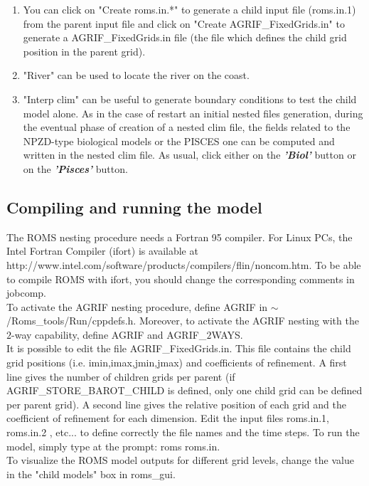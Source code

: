 \begin{enumerate}
\item You can click on "Create roms.in.*" to generate a child input file (roms.in.1)
  from the parent input file and click on "Create AGRIF\_FixedGrids.in" to generate a
  AGRIF\_FixedGrids.in file (the file which defines the child grid position in the
  parent grid).

\item "River" can be used to locate the river on the coast.

\item "Interp clim" can be useful to generate boundary conditions to test the child
  model alone. As in the case of restart an initial nested files generation, during
  the eventual phase of creation of a nested clim file, the fields related to the
  NPZD-type biological models or the PISCES one can be computed and written in the
  nested clim file.  As usual, click either on the \textit{\textbf{'Biol'}} button or
  on the \textit{\textbf{'Pisces'}} button.




\end{enumerate}
\subsection{Compiling and running the model}
The ROMS nesting procedure needs a Fortran 95 compiler. For Linux PCs,
the Intel Fortran Compiler (ifort) is available at \\
http://www.intel.com/software/products/compilers/flin/noncom.htm.  To be able to
compile ROMS with ifort, you should change the corresponding
comments in jobcomp. \\

To activate the AGRIF nesting procedure, define AGRIF in
$\sim$/Roms\_tools/Run/cppdefs.h. Moreover, to activate the AGRIF nesting with the
$2$-way capability, define AGRIF and AGRIF\_$2$WAYS. \\




It is possible to edit the file AGRIF\_FixedGrids.in.  This file contains the child
grid positions (i.e. imin,imax,jmin,jmax) and coefficients of refinement. A first
line gives the number of children grids per parent (if AGRIF\_STORE\_BAROT\_CHILD is
defined, only one child grid can be defined per parent grid). A second line gives the
relative position of each grid and the coefficient of refinement for each dimension.
Edit the input files roms.in.1, roms.in.2 , etc... to define correctly the file names
and the time steps. To run the model, simply type at the prompt: roms roms.in. \\

To visualize the ROMS model outputs for different grid levels, 
change the value in the "child models" box
in roms\_gui.


